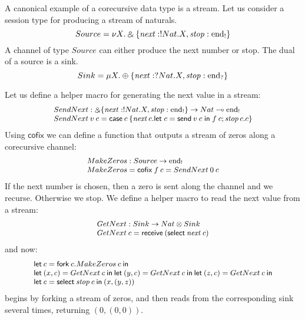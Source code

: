 \documentclass[orivec,envcountsame]{llncs}
\makeatletter
\newcommand{\with}{\mathbin\binampersand}
\newcommand{\lto}{\ensuremath{\multimap}}
\newcommand{\uto}{\ensuremath{\rightarrow}}
\newcommand{\outterm}{\mathrm{end}_!}
\newcommand{\interm}{\mathrm{end}_?}
\newcommand{\mkwd}[1]{\mathsf{#1}}
\newcommand{\clabel}[1]{\mathit{#1}}
\newcommand{\gvsend}[2]{\mkwd{send}\:#1\:#2}
\newcommand{\gvreceive}[1]{\mkwd{receive}\:#1}
\newcommand{\gvlet}[3]{\mkwd{let}\;#1 = #2\;\mkwd{in}\;#3}
\newcommand{\gvselect}[2]{\mkwd{select}\:#1\:#2}
\newcommand{\gvcase}[2]{\mkwd{case}\:#1\:\{#2\}}
\newcommand{\gvfork}[2]{\mkwd{fork}\:#1.#2}
\newcommand{\lrkwd}{\mkwd{cofix}}
\newcommand{\key}{\mkwd}
\newcommand{\cofix}{\lrkwd}
\newcommand{\ba}{\begin{array}}
\newcommand{\ea}{\end{array}}
\newcommand{\bl}{\ba[t]{@{}l@{}}}
\newcommand{\el}{\ea}
\makeatother
\begin{document}
A canonical example of a corecursive data type is a stream. Let us consider a session type for
producing a stream of naturals.
%
\[\small
Source = \nu X.\with \{\clabel{next}: !Nat.X, \clabel{stop}: \outterm \}
\]
%
A channel of type $Source$ can either produce the next number or stop. The dual of a source is a
sink.
\[\small
Sink = \mu X.\oplus \{\clabel{next}: ?Nat.X, \clabel{stop}: \interm \}
\]

Let us define a helper macro for generating the next value in a stream:
\[\small
\bl
SendNext : \with \{\clabel{next}: !Nat.X, \clabel{stop}: \outterm \} \uto Nat \lto \outterm \\
SendNext\:v\:c = \gvcase{c}{\clabel{next}\,c.\gvlet{c}{\gvsend{v}{c}}{f\:c};
                            \clabel{stop}\,c.c}
\el
\]
%
Using $\cofix$ we can define a function that outputs a stream of zeros along a corecursive
channel:
\[\small
  \bl
  MakeZeros : Source \uto \outterm \\
  MakeZeros = \cofix\:f\:c = SendNext\:0\:c
  \el
\]
If the next number is chosen, then a zero is sent along the channel and we recurse. Otherwise we
stop.
%
%
We define a helper macro to read the next value from a stream:
\[\small
\bl
GetNext : Sink \uto Nat \otimes Sink \\
GetNext\:c = \gvreceive{(\gvselect{\clabel{next}}{c})} \\
\el
\]
and now:
\[\small
\bl
\key{let}\:c = \gvfork{c}{MakeZeros\:c}\:\key{in} \\
\key{let}\:(x, c) = GetNext\:c\:\key{in}\:
\key{let}\:(y, c) = GetNext\:c\:\key{in}\:
\key{let}\:(z, c) = GetNext\:c\:\key{in} \\
\key{let}\:c = \gvselect{\clabel{stop}}{c}\:\key{in}\:(x, (y, z)) \\
\el
\]
begins by forking a stream of zeros, and then reads from the corresponding sink several times,
returning $(0, (0, 0))$.

\end{document}
